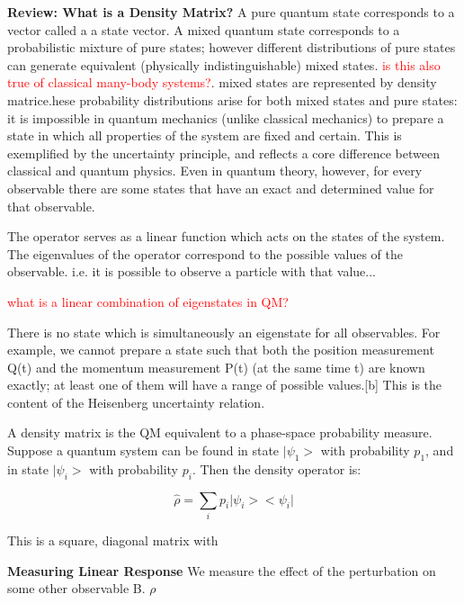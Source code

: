 \documentclass{article}
\begin{document}
\vspace{5mm}

\textbf{Review: What is a Density Matrix?}
A pure quantum state corresponds to a vector called a a state vector.  A mixed quantum state corresponds to a probabilistic mixture of pure states; however different distributions of pure states can generate equivalent (physically indistinguishable) mixed states. \textcolor{red}{is this also true of classical many-body systems?}. mixed states are represented by density matrice.hese probability distributions arise for both mixed states and pure states: it is impossible in quantum mechanics (unlike classical mechanics) to prepare a state in which all properties of the system are fixed and certain. This is exemplified by the uncertainty principle, and reflects a core difference between classical and quantum physics. Even in quantum theory, however, for every observable there are some states that have an exact and determined value for that observable.

The operator serves as a linear function which acts on the states of the system. The eigenvalues of the operator correspond to the possible values of the observable. i.e. it is possible to observe a particle with that value...

\textcolor{red}{what is a linear combination of eigenstates in QM?}

There is no state which is simultaneously an eigenstate for all observables. For example, we cannot prepare a state such that both the position measurement Q(t) and the momentum measurement P(t) (at the same time t) are known exactly; at least one of them will have a range of possible values.[b] This is the content of the Heisenberg uncertainty relation.

A density matrix is the QM equivalent to a phase-space probability measure. Suppose a quantum system can be found in state $\vert \psi_1 >$ with probability $p_1$, and in state $\vert \psi_i >$ with probability $p_i$. Then the density operator is:

\begin{equation}
\hat{\rho}=\sum_i p_i \vert \psi_i><\psi_i\vert
\end{equation}

\vspace{5mm} 

This is a square, diagonal matrix with 

\textbf{Measuring Linear Response}
We measure the effect of the perturbation on some other observable B.
$\rho$
\end{document}
